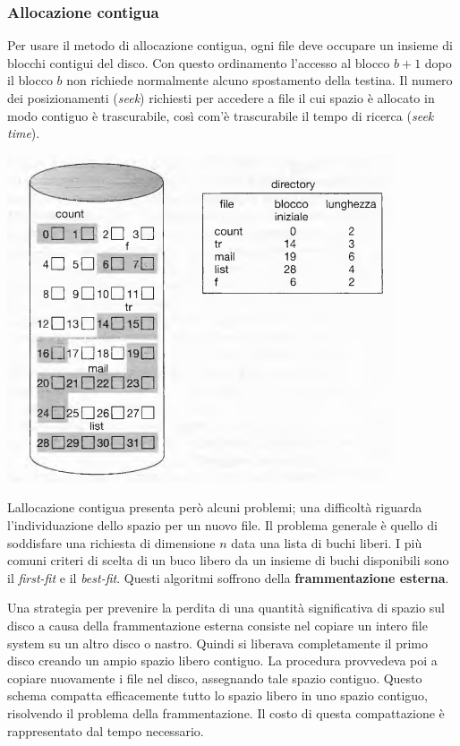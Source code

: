 \documentclass[11pt,a4paper]{article}
\begin{document}
{\subsubsection{Allocazione contigua}
Per usare il metodo di allocazione contigua, ogni file deve occupare un insieme di blocchi
contigui del disco. Con questo ordinamento l'accesso al blocco $b+1$ dopo il blocco $b$ non richiede normal­mente alcuno spostamento della testina. Il numero dei posizionamenti (\emph{seek}) richiesti per accedere a file il cui spazio è allocato in modo contiguo è trascurabile, così com'è trascurabile il tempo di ricerca (\emph{seek time}).
\begin{center}
  \includegraphics[scale=0.6]{img/0055.png}
\end{center}
Lallocazione contigua presenta però alcuni problemi; una difficoltà riguarda l'indivi­duazione dello spazio per un nuovo file.
Il problema generale è quello di soddisfare una richiesta di di­mensione $n$ data una lista di buchi liberi. I più comuni criteri di scelta di un buco libero da un insieme di buchi disponibili sono il \emph{first-fit} e il \emph{best-fit}. Questi algoritmi soffrono della \textbf{frammentazione esterna}.

Una strategia per prevenire la perdita di una quantità significativa di spazio sul disco a
causa della frammentazione esterna consiste nel copiare un intero file system su un altro di­sco o nastro. Quindi si liberava completamente il primo disco creando un ampio spazio li­bero contiguo. La procedura provvedeva poi a copiare nuovamente i file nel disco, asse­gnando tale spazio contiguo. Questo schema compatta efficacemente tutto lo spazio libero in uno spazio contiguo, risolvendo il problema della frammentazione. Il costo di questa compattazione è rappresentato dal tempo necessario.

}
\end{document}
